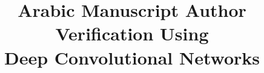 \documentclass[conference,a4paper,twocolumn]{IEEEtran}
\begin{document}



\title{Arabic Manuscript Author Verification Using\\ 
Deep Convolutional Networks}



\end{document}
